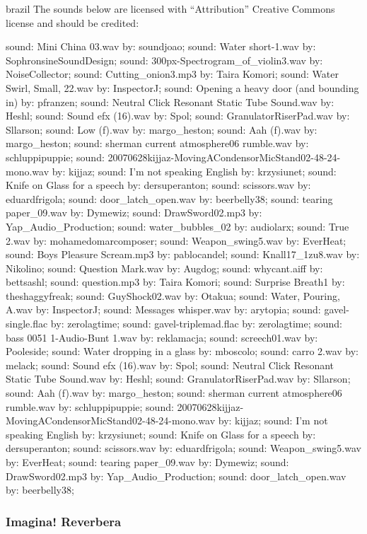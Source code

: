 \begin{otherlanguage*}{brazil}
The sounds below are licensed with ``Attribution'' Creative Commons license and should be credited:

sound: Mini China 03.wav by: soundjoao; sound: Water short-1.wav by: SophronsineSoundDesign; sound: 300px-Spectrogram\_of\_violin3.wav by: NoiseCollector; sound: Cutting\_onion3.mp3 by: Taira Komori; sound: Water Swirl, Small, 22.wav by: InspectorJ; sound: Opening a heavy door (and bounding in) by: pfranzen; sound: Neutral Click Resonant Static Tube Sound.wav by: Heshl; sound: Sound efx (16).wav by: Spol; sound: GranulatorRiserPad.wav by: Sllarson; sound: Low (f).wav by: margo\_heston; sound: Aah (f).wav by: margo\_heston; sound: sherman current atmosphere06 rumble.wav by: schluppipuppie; sound: 20070628kijjaz-MovingACondensorMicStand02-48-24-mono.wav by: kijjaz; sound: I'm not speaking English by: krzysiunet; sound: Knife on Glass for a speech by: dersuperanton; sound: scissors.wav by: eduardfrigola; sound: door\_latch\_open.wav by: beerbelly38; sound: tearing paper\_09.wav by: Dymewiz; sound: DrawSword02.mp3 by: Yap\_Audio\_Production; sound: water\_bubbles\_02 by: audiolarx; sound: True 2.wav by: mohamedomarcomposer; sound: Weapon\_swing5.wav by: EverHeat; sound: Boys Pleasure Scream.mp3 by: pablocandel; sound: Knall17\_1zu8.wav by: Nikolino; sound: Question Mark.wav by: Augdog; sound: whycant.aiff by: bettsashl; sound: question.mp3 by: Taira Komori; sound: Surprise Breath1 by: theshaggyfreak; sound: GuyShock02.wav by: Otakua; sound: Water, Pouring, A.wav by: InspectorJ; sound: Messages whisper.wav by: arytopia; sound: gavel-single.flac by: zerolagtime; sound: gavel-triplemad.flac by: zerolagtime; sound: bass 0051 1-Audio-Bunt 1.wav by: reklamacja; sound: screech01.wav by: Pooleside; sound: Water dropping in a glass by: mboscolo; sound: carro 2.wav by: melack; sound: Sound efx (16).wav by: Spol; sound: Neutral Click Resonant Static Tube Sound.wav by: Heshl; sound: GranulatorRiserPad.wav by: Sllarson; sound: Aah (f).wav by: margo\_heston; sound: sherman current atmosphere06 rumble.wav by: schluppipuppie; sound: 20070628kijjaz-MovingACondensorMicStand02-48-24-mono.wav by: kijjaz; sound: I'm not speaking English by: krzysiunet; sound: Knife on Glass for a speech by: dersuperanton; sound: scissors.wav by: eduardfrigola; sound: Weapon\_swing5.wav by: EverHeat; sound: tearing paper\_09.wav by: Dymewiz; sound: DrawSword02.mp3 by: Yap\_Audio\_Production; sound: door\_latch\_open.wav by: beerbelly38;


\subsubsection{Imagina! Reverbera}


\end{otherlanguage*}

